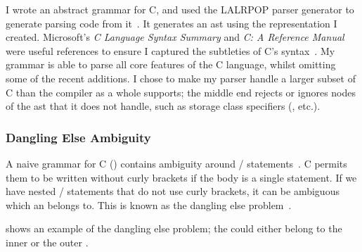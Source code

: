 \documentclass[00-main.tex]{subfiles}
\begin{document}
I wrote an abstract grammar for C, and used the LALRPOP parser generator to generate parsing code from it~.
It generates an \gls{ast} using the representation I created.
Microsoft's \emph{C Language Syntax Summary} and \emph{C: A Reference Manual} were useful references to ensure I captured the subtleties of C's syntax~. %
My grammar is able to parse all core features of the C language, whilst omitting some of the recent additions.
I chose to make my parser handle a larger subset of C than the compiler as a whole supports; the middle end rejects or ignores nodes of the \gls{ast} that it does not handle, such as storage class specifiers (, etc.).

\subsubsection{Dangling Else Ambiguity}

A naive grammar for C () contains ambiguity around / statements~.
C permits them to be written without curly brackets if the body is a single statement.
If we have nested / statements that do not use curly brackets, it can be ambiguous which  an  belongs to. This is known as the dangling else problem~.

 shows an example of the dangling else problem; the  could either belong to the inner or the outer .
\end{document}
